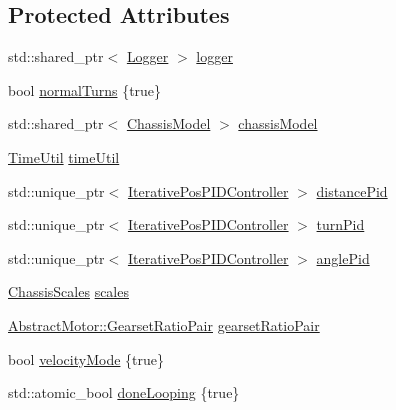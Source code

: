 \subsection*{Protected Attributes}
\begin{DoxyCompactItemize}
\item 
std\+::shared\+\_\+ptr$<$ \mbox{\hyperlink{classokapi_1_1Logger}{Logger}} $>$ \mbox{\hyperlink{classokapi_1_1ChassisControllerPID_a1ccab962675c8d76896f922abfa65e1d}{logger}}
\item 
bool \mbox{\hyperlink{classokapi_1_1ChassisControllerPID_a12fdde8486bd712e728b8e538a640387}{normal\+Turns}} \{true\}
\item 
std\+::shared\+\_\+ptr$<$ \mbox{\hyperlink{classokapi_1_1ChassisModel}{Chassis\+Model}} $>$ \mbox{\hyperlink{classokapi_1_1ChassisControllerPID_a3a5e73a21423f3a278b2e3b891960c7d}{chassis\+Model}}
\item 
\mbox{\hyperlink{classokapi_1_1TimeUtil}{Time\+Util}} \mbox{\hyperlink{classokapi_1_1ChassisControllerPID_a60df73805ef3747b6019303924e5ed18}{time\+Util}}
\item 
std\+::unique\+\_\+ptr$<$ \mbox{\hyperlink{classokapi_1_1IterativePosPIDController}{Iterative\+Pos\+P\+I\+D\+Controller}} $>$ \mbox{\hyperlink{classokapi_1_1ChassisControllerPID_a130a3d5ecf1e9dbb0d6884e4378b1887}{distance\+Pid}}
\item 
std\+::unique\+\_\+ptr$<$ \mbox{\hyperlink{classokapi_1_1IterativePosPIDController}{Iterative\+Pos\+P\+I\+D\+Controller}} $>$ \mbox{\hyperlink{classokapi_1_1ChassisControllerPID_a7f2979d063746b740e848c0d640f6671}{turn\+Pid}}
\item 
std\+::unique\+\_\+ptr$<$ \mbox{\hyperlink{classokapi_1_1IterativePosPIDController}{Iterative\+Pos\+P\+I\+D\+Controller}} $>$ \mbox{\hyperlink{classokapi_1_1ChassisControllerPID_a22677f191a4014e51f4f133d56d3bc76}{angle\+Pid}}
\item 
\mbox{\hyperlink{classokapi_1_1ChassisScales}{Chassis\+Scales}} \mbox{\hyperlink{classokapi_1_1ChassisControllerPID_acecccb0badc5500ab3220b446eb36f1b}{scales}}
\item 
\mbox{\hyperlink{structokapi_1_1AbstractMotor_1_1GearsetRatioPair}{Abstract\+Motor\+::\+Gearset\+Ratio\+Pair}} \mbox{\hyperlink{classokapi_1_1ChassisControllerPID_a9ad9dd6347f6c32cbe515a6c926570be}{gearset\+Ratio\+Pair}}
\item 
bool \mbox{\hyperlink{classokapi_1_1ChassisControllerPID_ac1ef51ed33571d43c8bf0b3fe3aff870}{velocity\+Mode}} \{true\}
\item 
std\+::atomic\+\_\+bool \mbox{\hyperlink{classokapi_1_1ChassisControllerPID_a73bdaf994929f7d81064159fba42a79f}{done\+Looping}} \{true\}

\end{DoxyCompactItemize}
